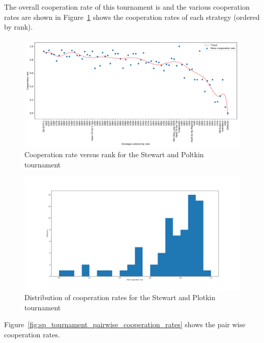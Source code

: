 \documentclass{article}
\begin{document}
The overall cooperation rate of this tournament is
and the various
cooperation rates are shown in
Figure~\ref{fig:sp_tournament_cooperation_rate_versus_rank} shows the
cooperation rates of each strategy (ordered by rank).

\begin{figure}[!hbtp]
    \centering
    \includegraphics[width=.8\textwidth]{assets/sp_tournament_cooperation_rate_versus_rank.pdf}
    \caption{Cooperation rate versus rank for the Stewart and Poltkin tournament}
    \label{fig:sp_tournament_cooperation_rate_versus_rank}
\end{figure}


\begin{figure}[!hbtp]
    \centering
    \includegraphics[width=.8\textwidth]{assets/sp_tournament_cooperation_rates.pdf}
    \caption{Distribution of cooperation rates for the Stewart and Plotkin
    tournament}
    \label{fig:sp_tournament_cooperation_rates}
\end{figure}

Figure~\ref{fig:sp_tournament_pairwise_cooperation_rates} shows the pair wise
cooperation rates.
\end{document}
